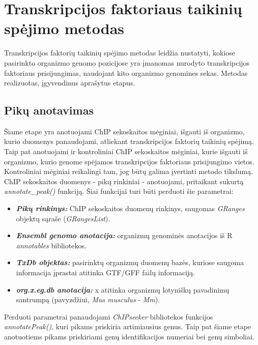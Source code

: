 \documentclass[12pt]{article}
\begin{document}
\newpage


\section{Transkripcijos faktoriaus taikinių spėjimo metodas}
Transkripcijos faktorių taikinių spėjimo metodas leidžia nustatyti, kokiose
pasirinkto organizmo genomo pozicijose yra įmanomas nurodyto transkripcijos
faktoriaus prisijungimas, naudojant kito organizmo genomines sekas. Metodas
realizuotas, įgyvendinus aprašytus etapus.

\subsection{Pikų anotavimas}
Šiame etape yra anotuojami ChIP sekoskaitos mėginiai, išgauti iš organizmo,
kurio duomenys panaudojami, atliekant transkripcijos faktorių taikinių spėjimą.
Taip pat anotuojami ir kontroliniai ChIP sekoskaitos mėginiai, kurie išgauti iš
organizmo, kurio genome spėjamos transkripcijos faktoriaus prisijungimo vietos.
Kontroliniai mėginiai reikalingi tam, jog būtų galima įvertinti metodo tikslumą.
ChIP sekoskaitos duomenys - pikų rinkiniai - anotuojami, pritaikant sukurtą
\emph{annotate\_peak()} funkciją. Šiai funkcijai turi būti perduoti šie
parametrai:

\begin{itemize}
    \item \textbf{\emph{Pikų rinkinys:}} ChIP sekoskaitos duomenų rinkinys,
        saugomas \emph{GRanges} objektų sąraše (\emph{GRangesList}).
    \item \textbf{\emph{Ensembl genomo anotacija:}} organizmų genominės
        anotacijos iš R \emph{annotables} bibliotekos.
    \item \textbf{\emph{TxDb objektas:}} pasirinktų organizmų duomenų bazės,
        kuriose saugoma informacija įprastai atitinka GTF/GFF failų informaciją.
    \item \textbf{\emph{org.x.eg.db anotacija:}} x atitinka organizmų lotyniškų
        pavadinimų santrumpą (pavyzdžiui, \emph{Mus musculus} - \emph{Mm}).
\end{itemize}

Perduoti parametrai panaudojami \emph{ChIPseeker} bibliotekos funkcijos
\emph{annotatePeak()}, kuri pikams priskiria artimiausius genus. Taip pat šiame
etape anotuotiems pikams priskiriami genų identifikacijos numeriai bei genų
simboliai.
\end{document}
